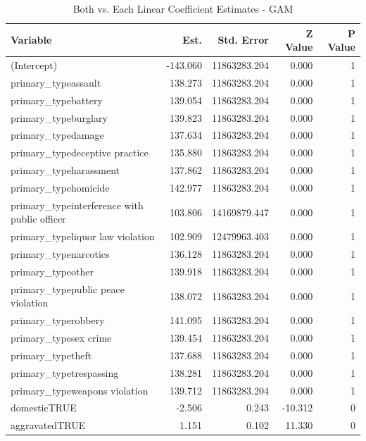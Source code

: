 \documentclass{ucetd}
\begin{document}
\begin{table}

\caption{\label{tab:both-gam}Both vs. Each Linear Coefficient Estimates - GAM}
\centering
\begin{tabular}[t]{l|r|r|r|r}
\hline
Variable & Est. & Std. Error & Z Value & P Value\\
\hline
(Intercept) & -143.060 & 11863283.204 & 0.000 & 1\\
\hline
primary\_typeassault & 138.273 & 11863283.204 & 0.000 & 1\\
\hline
primary\_typebattery & 139.054 & 11863283.204 & 0.000 & 1\\
\hline
primary\_typeburglary & 139.823 & 11863283.204 & 0.000 & 1\\
\hline
primary\_typedamage & 137.634 & 11863283.204 & 0.000 & 1\\
\hline
primary\_typedeceptive practice & 135.880 & 11863283.204 & 0.000 & 1\\
\hline
primary\_typeharassment & 137.862 & 11863283.204 & 0.000 & 1\\
\hline
primary\_typehomicide & 142.977 & 11863283.204 & 0.000 & 1\\
\hline
primary\_typeinterference with public officer & 103.806 & 14169879.447 & 0.000 & 1\\
\hline
primary\_typeliquor law violation & 102.909 & 12479963.403 & 0.000 & 1\\
\hline
primary\_typenarcotics & 136.128 & 11863283.204 & 0.000 & 1\\
\hline
primary\_typeother & 139.918 & 11863283.204 & 0.000 & 1\\
\hline
primary\_typepublic peace violation & 138.072 & 11863283.204 & 0.000 & 1\\
\hline
primary\_typerobbery & 141.095 & 11863283.204 & 0.000 & 1\\
\hline
primary\_typesex crime & 139.454 & 11863283.204 & 0.000 & 1\\
\hline
primary\_typetheft & 137.688 & 11863283.204 & 0.000 & 1\\
\hline
primary\_typetrespassing & 138.281 & 11863283.204 & 0.000 & 1\\
\hline
primary\_typeweapons violation & 139.712 & 11863283.204 & 0.000 & 1\\
\hline
domesticTRUE & -2.506 & 0.243 & -10.312 & 0\\
\hline
aggravatedTRUE & 1.151 & 0.102 & 11.330 & 0\\
\hline
\end{tabular}
\end{table}
\end{document}
